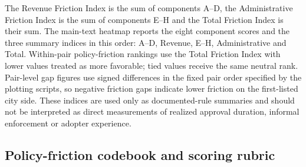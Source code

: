 \documentclass[pdflatex,sn-nature]{sn-jnl}
\begin{document}
The Revenue Friction Index is the sum of components A--D, the Administrative Friction Index is the sum of components E--H and the Total Friction Index is their sum. The main-text heatmap reports the eight component scores and the three summary indices in this order: A--D, Revenue, E--H, Administrative and Total. Within-pair policy-friction rankings use the Total Friction Index with lower values treated as more favorable; tied values receive the same neutral rank. Pair-level gap figures use signed differences in the fixed pair order specified by the plotting scripts, so negative friction gaps indicate lower friction on the first-listed city side. These indices are used only as documented-rule summaries and should not be interpreted as direct measurements of realized approval duration, informal enforcement or adopter experience.

\subsection{Policy-friction codebook and scoring rubric}


\end{document}

